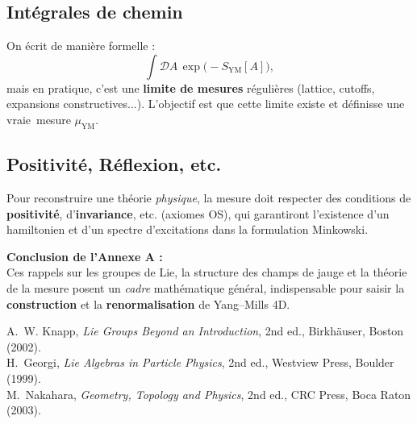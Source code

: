 \subsection*{Intégrales de chemin}
On écrit de manière formelle :
\[
\int \mathcal{D}A\,\exp\bigl(-S_{\mathrm{YM}}[A]\bigr),
\]
mais en pratique, c’est une \textbf{limite de mesures} régulières (lattice, cutoffs, expansions constructives...). L’objectif est que cette limite existe et définisse une \og vraie\fg\ mesure \(\mu_{\mathrm{YM}}\).

\subsection*{Positivité, Réflexion, etc.}
Pour reconstruire une théorie \emph{physique}, la mesure doit respecter des conditions de \textbf{positivité}, d’\textbf{invariance}, etc. (axiomes OS), qui garantiront l’existence d’un hamiltonien et d’un spectre d’excitations dans la formulation Minkowski.

\vspace{2em}

\noindent
\textbf{Conclusion de l’Annexe A :}\\
Ces rappels sur les groupes de Lie, la structure des champs de jauge et la théorie de la mesure posent un \emph{cadre} mathématique général, indispensable pour saisir la \textbf{construction} et la \textbf{renormalisation} de Yang--Mills 4D.  

\vspace{2em}

\begin{thebibliography}{99}
	
	A.~W. Knapp,
	\textit{Lie Groups Beyond an Introduction}, 2nd ed.,
	Birkhäuser, Boston (2002).
	\\[-0.75em]
	
	H.~Georgi,
	\textit{Lie Algebras in Particle Physics}, 2nd ed.,
	Westview Press, Boulder (1999).
	\\[-0.75em]
	
	M.~Nakahara,
	\textit{Geometry, Topology and Physics}, 2nd ed.,
	CRC Press, Boca Raton (2003).
	
\end{thebibliography}

